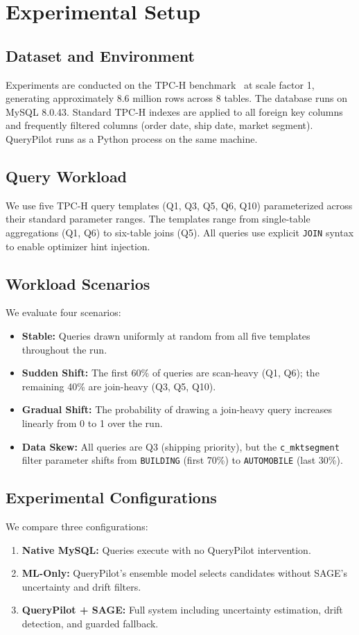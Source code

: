 \documentclass[conference]{IEEEtran}
\begin{document}
\section{Experimental Setup}

\subsection*{Dataset and Environment}
Experiments are conducted on the TPC-H benchmark~\cite{b9} at scale factor 1,
generating approximately 8.6 million rows across 8 tables. The database runs
on MySQL 8.0.43. Standard TPC-H indexes are applied to all foreign key columns
and frequently filtered columns (order date, ship date, market segment).
QueryPilot runs as a Python process on the same machine.

\subsection*{Query Workload}
We use five TPC-H query templates (Q1, Q3, Q5, Q6, Q10) parameterized across
their standard parameter ranges. The templates range from single-table
aggregations (Q1, Q6) to six-table joins (Q5). All queries use explicit
\texttt{JOIN} syntax to enable optimizer hint injection.

\subsection*{Workload Scenarios}
We evaluate four scenarios:
\begin{itemize}
\item \textbf{Stable:} Queries drawn uniformly at random from all five
templates throughout the run.
\item \textbf{Sudden Shift:} The first 60\% of queries are scan-heavy
(Q1, Q6); the remaining 40\% are join-heavy (Q3, Q5, Q10).
\item \textbf{Gradual Shift:} The probability of drawing a join-heavy query
increases linearly from 0 to 1 over the run.
\item \textbf{Data Skew:} All queries are Q3 (shipping priority), but the
\texttt{c\_mktsegment} filter parameter shifts from \texttt{BUILDING} (first
70\%) to \texttt{AUTOMOBILE} (last 30\%).
\end{itemize}

\subsection*{Experimental Configurations}
We compare three configurations:
\begin{enumerate}
\item \textbf{Native MySQL:} Queries execute with no QueryPilot intervention.
\item \textbf{ML-Only:} QueryPilot's ensemble model selects candidates
without SAGE's uncertainty and drift filters.
\item \textbf{QueryPilot + SAGE:} Full system including uncertainty
estimation, drift detection, and guarded fallback.
\end{enumerate}
\end{document}
